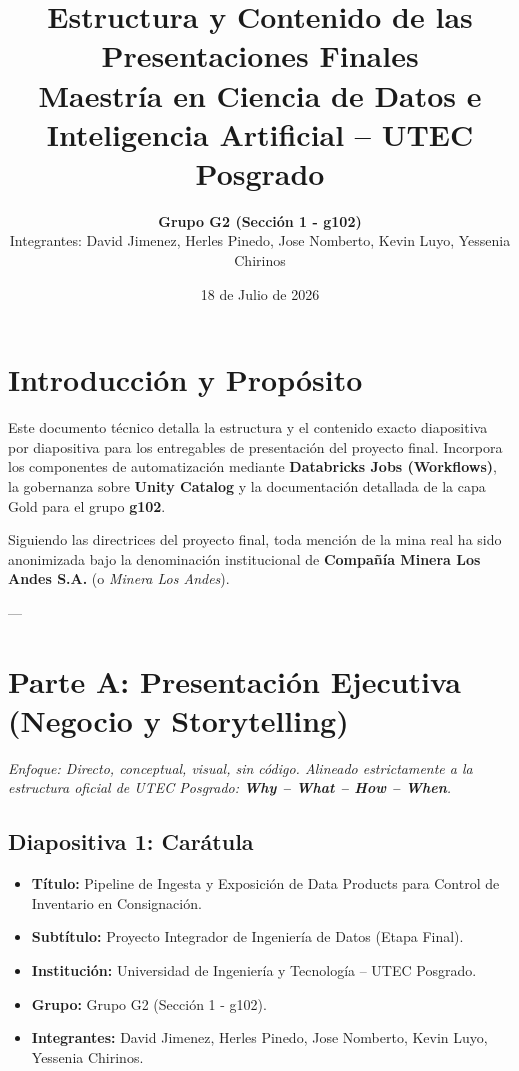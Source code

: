 \documentclass[11pt,a4paper]{article}
\title{\textbf{Estructura y Contenido de las Presentaciones Finales}\\
\large Maestría en Ciencia de Datos e Inteligencia Artificial -- UTEC Posgrado}
\author{\textbf{Grupo G2 (Sección 1 - g102)}\\ 
Integrantes: David Jimenez, Herles Pinedo, Jose Nomberto, Kevin Luyo, Yessenia Chirinos}
\date{18 de Julio de 2026}
\begin{document}
\maketitle
\tableofcontents
\newpage

\section{Introducción y Propósito}
Este documento técnico detalla la estructura y el contenido exacto diapositiva por diapositiva para los entregables de presentación del proyecto final. Incorpora los componentes de automatización mediante \textbf{Databricks Jobs (Workflows)}, la gobernanza sobre \textbf{Unity Catalog} y la documentación detallada de la capa Gold para el grupo \textbf{g102}.

Siguiendo las directrices del proyecto final, toda mención de la mina real ha sido anonimizada bajo la denominación institucional de \textbf{Compañía Minera Los Andes S.A.} (o \textit{Minera Los Andes}).

---

\section{Parte A: Presentación Ejecutiva (Negocio y Storytelling)}
\textit{Enfoque: Directo, conceptual, visual, sin código. Alineado estrictamente a la estructura oficial de UTEC Posgrado: \textbf{Why -- What -- How -- When}.}

\subsection{Diapositiva 1: Carátula}
\begin{itemize}[label=$\bullet$]
    \item \textbf{Título:} Pipeline de Ingesta y Exposición de Data Products para Control de Inventario en Consignación.
    \item \textbf{Subtítulo:} Proyecto Integrador de Ingeniería de Datos (Etapa Final).
    \item \textbf{Institución:} Universidad de Ingeniería y Tecnología -- UTEC Posgrado.
    \item \textbf{Grupo:} Grupo G2 (Sección 1 - g102).
    \item \textbf{Integrantes:} David Jimenez, Herles Pinedo, Jose Nomberto, Kevin Luyo, Yessenia Chirinos.
\end{itemize}
\end{document}

